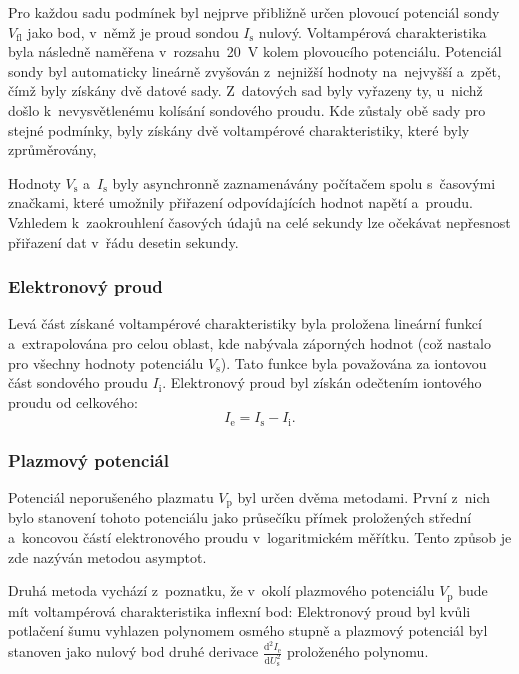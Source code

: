 \documentclass{protokol}
\newcommand\iprobe{I_\mathrm{s}}
\newcommand\iion{I_\mathrm{i}}
\newcommand\ielec{I_\mathrm{e}}
\newcommand\flpot{V_\mathrm{fl}}
\newcommand\plpot{V_\mathrm{p}}
\newcommand\potprobe{V_\mathrm{s}}
\newcommand\uprobe{U_\mathrm{s}}
\newcommand\didu{\frac{\mathrm d^2 \ielec}{\mathrm d \uprobe^2}}
\begin{document}
Pro každou sadu podmínek byl nejprve přibližně určen plovoucí potenciál sondy
$\flpot$ jako bod, v~němž je proud sondou $\iprobe$ nulový.
Voltampérová charakteristika byla následně naměřena v~rozsahu~\SI{20}{\volt}
kolem plovoucího potenciálu.
Potenciál sondy byl automaticky lineárně zvyšován z~nejnižší hodnoty
na~nejvyšší a~zpět, čímž byly získány dvě datové sady.
Z~datových sad byly vyřazeny ty, u~nichž došlo k~nevysvětlenému kolísání
sondového proudu.
Kde zůstaly obě sady pro stejné podmínky, byly získány dvě voltampérové
charakteristiky, které byly zprůměrovány,

Hodnoty $\potprobe$ a~$\iprobe$ byly asynchronně zaznamenávány počítačem
spolu s~časovými značkami, které umožnily přiřazení odpovídajících hodnot
napětí a~proudu.
Vzhledem k~zaokrouhlení časových údajů na celé sekundy lze očekávat
nepřesnost přiřazení dat v~řádu desetin sekundy.

\subsubsection{Elektronový proud}
Levá část získané voltampérové charakteristiky byla proložena lineární funkcí
a~extrapolována pro celou oblast, kde nabývala záporných hodnot
(což nastalo pro všechny hodnoty potenciálu $\potprobe$).
Tato funkce byla považována za iontovou část sondového proudu $\iion$.
Elektronový proud byl získán odečtením iontového proudu od celkového:
\begin{equation}
	\label{eq:ielec}
	\ielec = \iprobe - \iion.
\end{equation}

\subsubsection{Plazmový potenciál}
Potenciál neporušeného plazmatu $\plpot$ byl určen dvěma metodami.
První z~nich bylo stanovení tohoto potenciálu jako průsečíku přímek
proložených střední a~koncovou částí elektronového proudu v~logaritmickém
měřítku.
Tento způsob je zde nazýván metodou asymptot.

Druhá metoda vychází z~poznatku, že v~okolí plazmového potenciálu $\plpot$
bude mít voltampérová charakteristika inflexní bod:
Elektronový proud byl kvůli potlačení šumu vyhlazen polynomem osmého stupně
a plazmový potenciál byl stanoven jako nulový bod druhé derivace $\didu$
proloženého polynomu.
\end{document}
